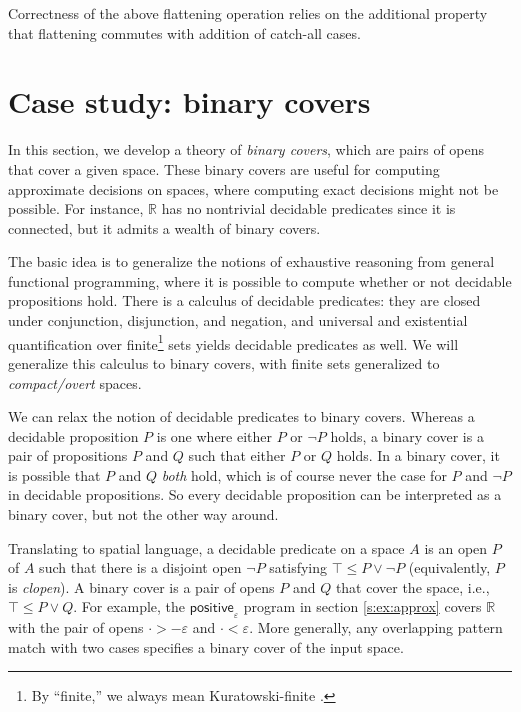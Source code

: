 \documentclass[conference]{IEEEtran}
\newcommand{\R}{\mathbb{R}}
\begin{document}
Correctness of the above flattening operation relies on the additional property that flattening commutes with addition of catch-all cases.

\section{Case study: binary covers}
\label{s:bcover}

In this section, we develop a theory of \emph{binary covers}, which are pairs of opens that cover a given space. These binary covers are useful for computing approximate decisions on spaces, where computing exact decisions might not be possible. For instance, $\R$ has no nontrivial decidable predicates since it is connected, but it admits a wealth of binary covers. 

The basic idea is to generalize the notions of exhaustive reasoning from general functional programming, where it is possible to compute whether or not decidable propositions hold. There is a calculus of decidable predicates: they are closed under conjunction, disjunction, and negation, and universal and existential quantification over finite\footnote{
By ``finite,'' we always mean Kuratowski-finite \cite{johnstonetopos}.}
sets yields decidable predicates as well.
We will generalize this calculus to binary covers, with finite sets generalized to \emph{compact/overt} spaces.

We can relax the notion of decidable predicates to binary covers. Whereas a decidable proposition $P$ is one where either $P$ or $\neg P$ holds, a binary cover is a pair of propositions $P$ and $Q$ such that either $P$ or $Q$ holds. In a binary cover, it is possible that $P$ and $Q$ \emph{both} hold, which is of course never the case for $P$ and $\neg P$ in decidable propositions. So every decidable proposition can be interpreted as a binary cover, but not the other way around.

Translating to spatial language, a decidable predicate on a space $A$ is an open $P$ of $A$ such that there is a disjoint open $\neg P$ satisfying $\top \le P \vee \neg P$ (equivalently, $P$ is \emph{clopen}). A binary cover is a pair of opens $P$ and $Q$ that cover the space, i.e., $\top \le P \vee Q$. For example, the $\mathsf{positive}_\varepsilon$ program in section \ref{s:ex:approx} covers $\R$ with the pair of opens $\cdot > - \varepsilon$ and $\cdot < \varepsilon$. More generally, any overlapping pattern match with two cases specifies a binary cover of the input space.
\end{document}
